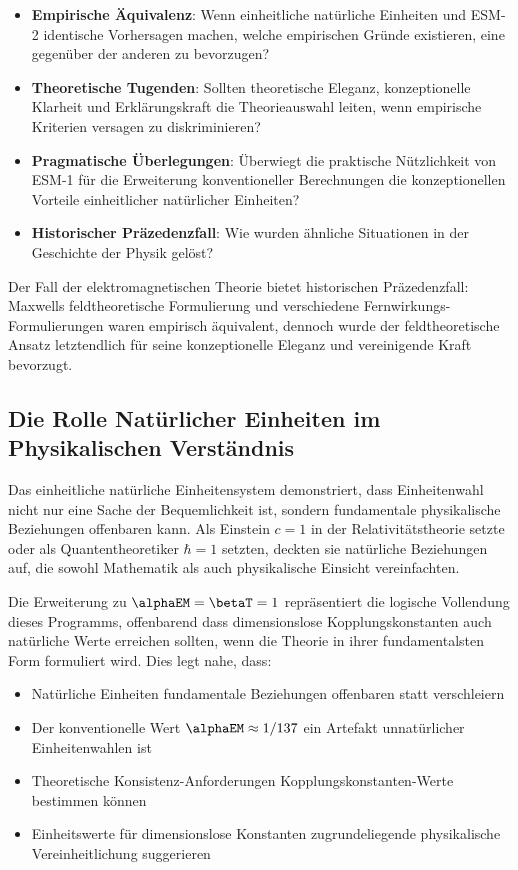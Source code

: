 	\begin{itemize}
		\item \textbf{Empirische Äquivalenz}: Wenn einheitliche natürliche Einheiten und ESM-2 identische Vorhersagen machen, welche empirischen Gründe existieren, eine gegenüber der anderen zu bevorzugen?
		\item \textbf{Theoretische Tugenden}: Sollten theoretische Eleganz, konzeptionelle Klarheit und Erklärungskraft die Theorieauswahl leiten, wenn empirische Kriterien versagen zu diskriminieren?
		\item \textbf{Pragmatische Überlegungen}: Überwiegt die praktische Nützlichkeit von ESM-1 für die Erweiterung konventioneller Berechnungen die konzeptionellen Vorteile einheitlicher natürlicher Einheiten?
		\item \textbf{Historischer Präzedenzfall}: Wie wurden ähnliche Situationen in der Geschichte der Physik gelöst?
	\end{itemize}
	
	Der Fall der elektromagnetischen Theorie bietet historischen Präzedenzfall: Maxwells feldtheoretische Formulierung und verschiedene Fernwirkungs-Formulierungen waren empirisch äquivalent, dennoch wurde der feldtheoretische Ansatz letztendlich für seine konzeptionelle Eleganz und vereinigende Kraft bevorzugt.
	
	\subsection{Die Rolle Natürlicher Einheiten im Physikalischen Verständnis}
	\label{subsec:natural_units_understanding}
	
	Das einheitliche natürliche Einheitensystem demonstriert, dass Einheitenwahl nicht nur eine Sache der Bequemlichkeit ist, sondern fundamentale physikalische Beziehungen offenbaren kann. Als Einstein $c = 1$ in der Relativitätstheorie setzte oder als Quantentheoretiker $\hbar = 1$ setzten, deckten sie natürliche Beziehungen auf, die sowohl Mathematik als auch physikalische Einsicht vereinfachten.
	
	Die Erweiterung zu $\alphaEM = \betaT = 1$ repräsentiert die logische Vollendung dieses Programms, offenbarend dass dimensionslose Kopplungskonstanten auch natürliche Werte erreichen sollten, wenn die Theorie in ihrer fundamentalsten Form formuliert wird. Dies legt nahe, dass:
	
	\begin{itemize}
		\item Natürliche Einheiten fundamentale Beziehungen offenbaren statt verschleiern
		\item Der konventionelle Wert $\alphaEM \approx 1/137$ ein Artefakt unnatürlicher Einheitenwahlen ist
		\item Theoretische Konsistenz-Anforderungen Kopplungskonstanten-Werte bestimmen können
		\item Einheitswerte für dimensionslose Konstanten zugrundeliegende physikalische Vereinheitlichung suggerieren
	\end{itemize}
	
